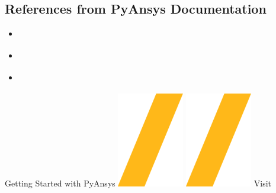 \documentclass[9pt,landscape]{article}
\begin{document}
\begin{multicols}{3}
\subsection{References from PyAnsys Documentation}
\begin{itemize}
\item \href{https://prime.docs.pyansys.com/version/stable/getting_started/index.html}{\color{blue}{PyPrimeMesh - Getting Started}}
\item \href{https://prime.docs.pyansys.com/version/stable/user_guide/index.html}{\color{blue}{PyPrimeMesh - User guide}}
\item \href{https://prime.docs.pyansys.com/version/stable/examples/index.html}{\color{blue}{PyPrimeMesh - Examples}}
\end{itemize}
\end{multicols}

\vspace{-0.15cm}
\noindent\makebox[\linewidth]{\rule{\paperwidth}{4pt}}
\begin{center}
Getting Started with PyAnsys \includegraphics[height=\fontcharht\font`\S]{slash.png} \href{https://github.com/pyansys}{\color{blue}{PyAnsys on GitHub}} \includegraphics[height=\fontcharht\font`\S]{slash.png} Visit 
\end{center}
\end{document}
